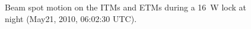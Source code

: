 \begin{figure}
\begin{centering}
\caption[Beam spot motion on the ITMs and ETMs during a 16~W
lock]{Beam spot motion on the ITMs and ETMs during a 16~W lock at
  night (May21, 2010, 06:02:30 UTC).}
\label{fig:bsm}
\end{centering}
\end{figure}


